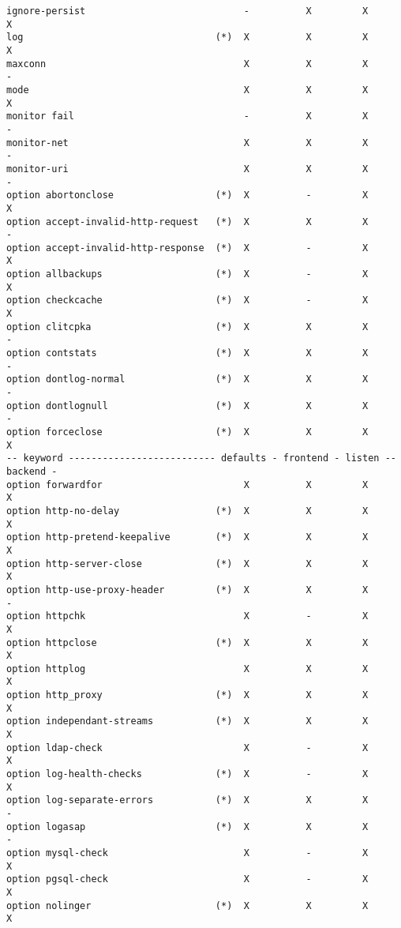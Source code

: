 \begin{verbatim}
ignore-persist                            -          X         X         X
log                                  (*)  X          X         X         X
maxconn                                   X          X         X         -
mode                                      X          X         X         X
monitor fail                              -          X         X         -
monitor-net                               X          X         X         -
monitor-uri                               X          X         X         -
option abortonclose                  (*)  X          -         X         X
option accept-invalid-http-request   (*)  X          X         X         -
option accept-invalid-http-response  (*)  X          -         X         X
option allbackups                    (*)  X          -         X         X
option checkcache                    (*)  X          -         X         X
option clitcpka                      (*)  X          X         X         -
option contstats                     (*)  X          X         X         -
option dontlog-normal                (*)  X          X         X         -
option dontlognull                   (*)  X          X         X         -
option forceclose                    (*)  X          X         X         X
-- keyword -------------------------- defaults - frontend - listen -- backend -
option forwardfor                         X          X         X         X
option http-no-delay                 (*)  X          X         X         X
option http-pretend-keepalive        (*)  X          X         X         X
option http-server-close             (*)  X          X         X         X
option http-use-proxy-header         (*)  X          X         X         -
option httpchk                            X          -         X         X
option httpclose                     (*)  X          X         X         X
option httplog                            X          X         X         X
option http_proxy                    (*)  X          X         X         X
option independant-streams           (*)  X          X         X         X
option ldap-check                         X          -         X         X
option log-health-checks             (*)  X          -         X         X
option log-separate-errors           (*)  X          X         X         -
option logasap                       (*)  X          X         X         -
option mysql-check                        X          -         X         X
option pgsql-check                        X          -         X         X
option nolinger                      (*)  X          X         X         X

\end{verbatim}
